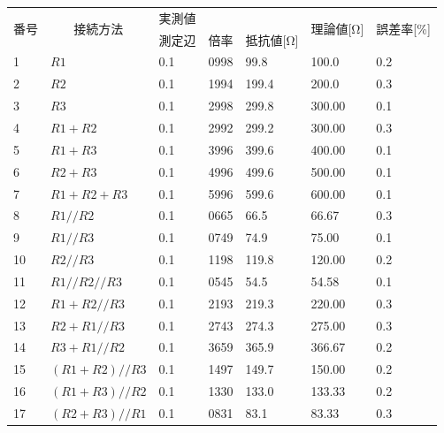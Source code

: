 \documentclass[titlepage]{jarticle}
\begin{document}
\begin{table}[H]
    \begin{tabular}{l|l|l|l|l|l|l}
        \hline\hline
        \multirow{2}{*}{番号} & \multicolumn{1}{c|}{\multirow{2}{*}{接続方法}} & \multicolumn{3}{l|}{実測値} & \multirow{2}{*}{理論値{[}Ω{]}} & \multirow{2}{*}{誤差率{[}\%{]}} \\ \cline{3-5}
         & \multicolumn{1}{c|}{} & 測定辺 & 倍率 & 抵抗値{[}Ω{]} &  &  \\ \hline
    \multicolumn{1}{l|}{1} & $R1$ & 0.1 & 0998 & 99.8 & \multicolumn{1}{l|}{100.0} & 0.2 \\
    \multicolumn{1}{l|}{2} & $R2$ & 0.1 & 1994 & 199.4 & \multicolumn{1}{l|}{200.0} & 0.3 \\
    \multicolumn{1}{l|}{3} & $R3$ & 0.1 & 2998 & 299.8 & \multicolumn{1}{l|}{300.00} & 0.1 \\ \hline
    \multicolumn{1}{l|}{4} & $R1 + R2$ & 0.1 & 2992 & 299.2 & \multicolumn{1}{l|}{300.00} & 0.3 \\
    \multicolumn{1}{l|}{5} & $R1 + R3$ & 0.1 & 3996 & 399.6 & \multicolumn{1}{l|}{400.00} & 0.1 \\
    \multicolumn{1}{l|}{6} & $R2 + R3$ & 0.1 & 4996 & 499.6 & \multicolumn{1}{l|}{500.00} & 0.1 \\
    \multicolumn{1}{l|}{7} & $R1 + R2 + R3$ & 0.1 & 5996 & 599.6 & \multicolumn{1}{l|}{600.00} & 0.1 \\
    \multicolumn{1}{l|}{8} & $R1 // R2$ & 0.1 & 0665 & 66.5 & \multicolumn{1}{l|}{66.67} & 0.3 \\
    \multicolumn{1}{l|}{9} & $R1 // R3$ & 0.1 & 0749 & 74.9 & \multicolumn{1}{l|}{75.00} & 0.1 \\
    \multicolumn{1}{l|}{10} & $R2 // R3$ & 0.1 & 1198 & 119.8 & \multicolumn{1}{l|}{120.00} & 0.2 \\
    \multicolumn{1}{l|}{11} & $R1 // R2 // R3$ & 0.1 & 0545 & 54.5 & \multicolumn{1}{l|}{54.58} & 0.1 \\
    \multicolumn{1}{l|}{12} & $R1 + R2 // R3$ & 0.1 & 2193 & 219.3 & \multicolumn{1}{l|}{220.00} & 0.3 \\
    \multicolumn{1}{l|}{13} & $R2 + R1 // R3$ & 0.1 & 2743 & 274.3 & \multicolumn{1}{l|}{275.00} & 0.3 \\
    \multicolumn{1}{l|}{14} & $R3 + R1 // R2$ & 0.1 & 3659 & 365.9 & \multicolumn{1}{l|}{366.67} & 0.2 \\
    \multicolumn{1}{l|}{15} & $(R1 + R2) // R3$ & 0.1 & 1497 & 149.7 & \multicolumn{1}{l|}{150.00} & 0.2 \\
    \multicolumn{1}{l|}{16} & $(R1 + R3) // R2$ & 0.1 & 1330 & 133.0 & \multicolumn{1}{l|}{133.33} & 0.2 \\
    \multicolumn{1}{l|}{17} & $(R2 + R3) // R1$ & 0.1 & 0831 & 83.1 & \multicolumn{1}{l|}{83.33} & 0.3 \\ \hline
    \end{tabular}
    \end{table}
\end{document}
